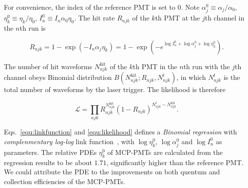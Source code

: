 For convenience, the index of the reference PMT is set to 0. Note $\alpha_j^0\equiv\alpha_j/{\alpha_0}$, $\eta_k^0\equiv\eta_k/{\eta_0}$, $I_n^0\equiv I_n\alpha_0\eta_0$.  The hit rate $R_{njk}$ of the $k$th PMT at the $j$th channel in the $n$th run is

\begin{equation}
    \label{equ:linkfunction}
    R_{njk}=1-\exp\left(-I_n\alpha_j\eta_k\right)=1-\exp\left(-e^{\log{I_n^0}+\log{\alpha_j^0}+\log{\eta_k^0}}\right).
\end{equation}

The number of hit waveforms $N^{\mathrm{hit}}_{njk}$ of the $k$th PMT in the $n$th run with the $j$th channel obeys Binomial distribution $B(N^{\mathrm{hit}}_{njk};R_{njk},N^t_{njk})$, in which $N^t_{njk}$ is the total number of waveforms by the laser trigger. The likelihood is therefore

\begin{equation}
    \label{equ:likelihood}
    \mathcal{L}=\prod_{njk}{R_{njk}^{N^\mathrm{hit}_{njk}}(1-R_{njk})^{N^t_{njk}-N^{\mathrm{hit}}_{njk}}}.
\end{equation}

Eqs.~\eqref{equ:linkfunction} and \eqref{equ:likelihood} defines a \emph{Binomial regression} with \emph{complenmentary log-log} link function~\cite{glm}, with $\log{\eta_k^0}$, $\log{\alpha_j^0}$ and $\log{I_n^0}$ as parameters. The relative PDEs $\eta_k^0$ of MCP-PMTs are calculated from the regression results to be about $1.71$, significantly higher than the reference PMT.  We could attribute the PDE to the improvements on both quentum and collection efficiencies of the MCP-PMTs.

